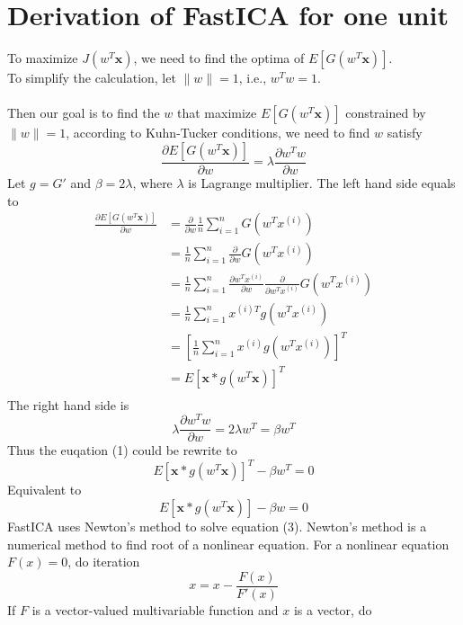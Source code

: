 \documentclass[11pt]{article}
\begin{document}
\section{Derivation of FastICA for one unit}
To maximize $J(w^T\mathbf{x})$, we need to find the optima of $E[G(w^T\mathbf{x})]$. \\
To simplify the calculation, let $\|w\|=1$, i.e., $w^Tw=1$.\\\\
Then our goal is to find the $w$ that maximize $E[G(w^T\mathbf{x})]$ constrained by $\|w\|=1$, 
according to Kuhn-Tucker conditions, we need to find $w$ satisfy 
\begin{equation}
    \frac{\partial E[G(w^T\mathbf{x})]}{\partial w} = \lambda\frac{\partial w^Tw}{\partial w}
\end{equation}
Let $g=G'$ and $\beta = 2\lambda$, where $\lambda$ is Lagrange multiplier. 
The left hand side equals to
$$
\begin{aligned}
    \frac{\partial E[G(w^T\mathbf{x})]}{\partial w} &= 
    \frac{\partial}{\partial w}\frac{1}{n}\sum_{i=1}^nG(w^Tx^{(i)})\\
    &=\frac{1}{n}\sum_{i=1}^n \frac{\partial}{\partial w} G(w^Tx^{(i)})\\
    &=\frac{1}{n}\sum_{i=1}^n \frac{\partial w^Tx^{(i)}}{\partial w} \frac{\partial}{\partial w^Tx^{(i)}} G(w^Tx^{(i)})\\
    &= \frac{1}{n}\sum_{i=1}^n x^{(i)T}g(w^Tx^{(i)})\\
    &= \left[ \frac{1}{n}\sum_{i=1}^n x^{(i)}g(w^Tx^{(i)}) \right]^T\\
    &=E\left[
        \mathbf{x} * g(w^T\mathbf{x})
    \right]^T\\
\end{aligned}
$$
The right hand side is
$$
\lambda\frac{\partial w^Tw}{\partial w} = 2\lambda w^T = \beta w^T
$$
Thus the euqation (1) could be rewrite to 
\begin{equation}
    E\left[
        \mathbf{x} * g(w^T\mathbf{x})
    \right]^T - \beta w^T = 0
\end{equation}
Equivalent to 
\begin{equation}
    E\left[
        \mathbf{x} * g(w^T\mathbf{x})
    \right] - \beta w = 0
\end{equation}
FastICA uses Newton's method to solve equation (3). Newton's method is a numerical method 
to find root of a nonlinear equation. For a nonlinear equation $F(x)=0$, do iteration
$$
x = x - \frac{F(x)}{F'(x)}
$$
If $F$ is a vector-valued multivariable function and $x$ is a vector, do
\end{document}

